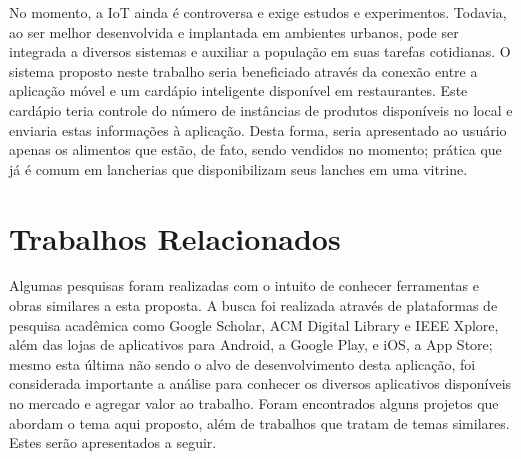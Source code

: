 No momento, a IoT ainda é controversa e exige estudos e experimentos. Todavia, ao ser melhor desenvolvida e implantada em ambientes urbanos, pode ser integrada a diversos sistemas e auxiliar a população em suas tarefas cotidianas. O sistema proposto neste trabalho seria beneficiado através da conexão entre a aplicação móvel e um cardápio inteligente disponível em restaurantes. Este cardápio teria controle do número de instâncias de produtos disponíveis no local e enviaria estas informações à aplicação. Desta forma, seria apresentado ao usuário apenas os alimentos que estão, de fato, sendo vendidos no momento; prática que já é comum em lancherias que disponibilizam seus lanches em uma vitrine.


\section{Trabalhos Relacionados}
Algumas pesquisas foram realizadas com o intuito de conhecer ferramentas e obras similares a esta proposta. A busca foi realizada através de plataformas de pesquisa acadêmica como Google Scholar, ACM Digital Library e IEEE Xplore, além das lojas de aplicativos para Android, a Google Play, e iOS, a App Store; mesmo esta última não sendo o alvo de desenvolvimento desta aplicação, foi considerada importante a análise para conhecer os diversos aplicativos disponíveis no mercado e agregar valor ao trabalho. Foram encontrados alguns projetos que abordam o tema aqui proposto, além de trabalhos que tratam de temas similares. Estes serão apresentados a seguir.


